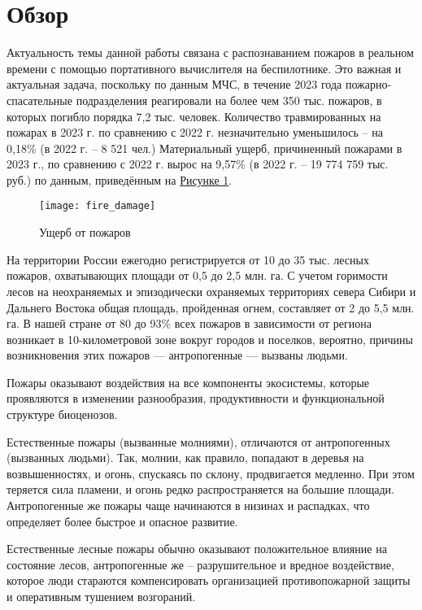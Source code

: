 \chapter{Обзор}
\label{ch:view}

    Актуальность темы данной работы связана с распознаванием пожаров в реальном времени с помощью портативного вычислителя на беспилотнике. Это важная и актуальная задача, поскольку по данным МЧС, в течение 2023 года пожарно-спасательные подразделения реагировали на более чем 350 тыс. пожаров, в которых погибло порядка 7,2 тыс. человек. Количество травмированных на пожарах в 2023 г. по сравнению с 2022 г. незначительно уменьшилось – на 0,18\% (в 2022 г. – 8 521 чел.) Материальный ущерб, причиненный пожарами в 2023 г., по сравнению с 2022 г. вырос на 9,57\% (в 2022 г. – 19 774 759 тыс. руб.) по данным, приведённым на \hyperref[fig:fire_damage]{Рисунке 1}.

    \begin{figure}[ht]
        \centering
        \texttt{[image: fire\_damage]}
        \caption{Ущерб от пожаров}
        \label{fig:fire_damage}
    \end{figure}

    На территории России ежегодно регистрируется от 10 до 35 тыс. лесных пожаров, охватывающих площади от 0,5 до 2,5 млн. га. С учетом горимости лесов на неохраняемых и эпизодически охраняемых территориях севера Сибири и Дальнего Востока общая площадь, пройденная огнем, составляет от 2 до 5,5 млн. га. В нашей стране от 80 до 93\% всех пожаров в зависимости от региона возникает в 10-ки­лометровой зоне вокруг городов и поселков, вероятно, причины возникновения этих пожаров — антропогенные — вызваны людьми.

    Пожары оказывают воздействия на все компоненты экосистемы, которые проявляются в изменении разнообразия, продуктивности и функциональной структуре биоценозов.

    Естественные пожары (вызванные молниями), отличаются от антропогенных (вызванных людьми). Так, молнии, как правило, попадают в деревья на возвышенностях, и огонь, спускаясь по склону, продвигается медленно. При этом теряется сила пламени, и огонь редко распространяется на большие площади. Антропогенные же пожары чаще начинаются в низинах и распадках, что определяет более быстрое и опасное развитие.

    Естественные лесные пожары обычно оказывают положительное влияние на состояние лесов, антропогенные же – разрушительное и вредное воздействие, которое люди стараются компенсировать организацией противопожарной защиты и оперативным тушением возгораний.

